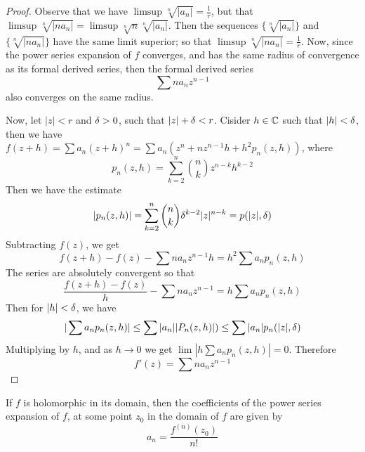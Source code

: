 \begin{proof}
    Observe that we have $\limsup{\sqrt[n]{|a_n|}}=\frac{1}{r}$, but that
    $\limsup{\sqrt[n]{|na_n|}}=\limsup{\sqrt[n]{n}\sqrt[n]{|a_n|}}$. Then the
    sequences $\{\sqrt[n]{|a_n|}\}$ and $\{\sqrt[n]{|na_n|}\}$ have the same
    limit superior; so that $\limsup{\sqrt[n]{|na_n|}}=\frac{1}{r}$. Now, since
    the power series expansion of $f$ converges, and has the same radius of
    convergence as its formal derived series, then the formal derived series
    \begin{equation*}
        \sum{na_nz^{n-1}}
    \end{equation*}
    also converges on the same radius.

    Now, let $|z|<r$ and  $\delta>0$, such that  $|z|+\delta<r$. Cisider  $h \in \mathbb{C}$
    such that  $|h|<\delta$, then we have
    $f(z+h)=\sum{a_n(z+h)^n}=\sum{a_n(z^n+nz^{n-1}h+h^2p_n(z,h))}$, where
    \begin{equation*}
        p_n(z,h)=\sum_{k=2}^n{{n \choose k}z^{n-k}h^{k-2}}
    \end{equation*}
    Then we have the estimate
    \begin{equation*}
        |p_n(z,h)|=\sum_{k=2}^n{{n \choose k}\delta^{k-2}|z|^{n-k}}=p(|z|,\delta)
    \end{equation*}
    Subtracting $f(z)$, we get
    \begin{equation*}
        f(z+h)-f(z)-\sum{na_nz^{n-1}h}=h^2\sum{a_np_n(z,h)}
    \end{equation*}
    The series are absolutely convergent so that
    \begin{equation*}
        \frac{f(z+h)-f(z)}{h}-\sum{na_nz^{n-1}}=h\sum{a_np_n(z,h)}
    \end{equation*}
    Then for $|h|<\delta$, we have
    \begin{equation*}
        |\sum{a_np_n(z,h)}| \leq \sum{|a_n||P_n(z,h)|)} \leq
        \sum{|a_n|p_n(|z|,\delta)}
    \end{equation*}
    Multiplying by $h$, and as  $h \xrightarrow{} 0$ we get
    $\lim{|h\sum{a_np_n(z,h)}|}=0$. Therefore
    \begin{equation*}
        f'(z)=\sum{na_nz^{n-1}}
    \end{equation*}
\end{proof}
\begin{corollary}
    If $f$ is holomorphic in its domain, then the coefficients of the power
    series expansion of $f$, at some point $z_0$ in the domain of $f$ are given
    by
    \begin{equation*}
        a_n=\frac{f^{(n)}(z_0)}{n!}
    \end{equation*}
\end{corollary}


